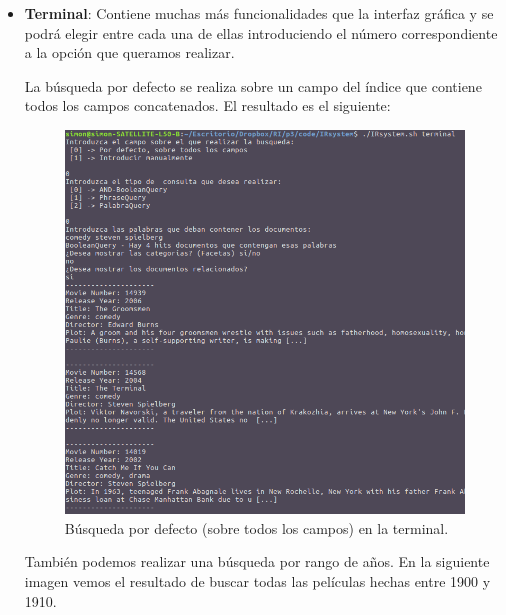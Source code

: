 \begin{itemize}
\item \textbf{Terminal}: Contiene muchas más funcionalidades que la interfaz gráfica y se podrá elegir entre cada una de ellas introduciendo el número correspondiente a la opción que queramos realizar.

La búsqueda por defecto se realiza sobre un campo del índice que contiene todos los campos concatenados. El resultado es el siguiente:

\begin{figure}[H]
	\centering
	\includegraphics[scale=0.5]{images/defecto.png}
	\caption{Búsqueda por defecto (sobre todos los campos) en la terminal.}
\end{figure}
\newpage
También podemos realizar una búsqueda por rango de años. En la siguiente imagen vemos el resultado de buscar todas las películas hechas entre 1900 y 1910.


\end{itemize}
